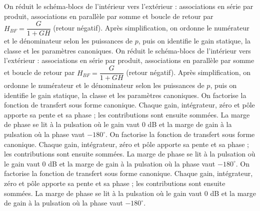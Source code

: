 \begin{corrigebox}[Corrigé]
On réduit le schéma-blocs de l'intérieur vers l'extérieur : associations en série par produit, associations en parallèle par somme et boucle de retour par $H_{BF}=\dfrac{G}{1+GH}$ (retour négatif). Après simplification, on ordonne le numérateur et le dénominateur selon les puissances de $p$, puis on identifie le gain statique, la classe et les paramètres canoniques.
On réduit le schéma-blocs de l'intérieur vers l'extérieur : associations en série par produit, associations en parallèle par somme et boucle de retour par $H_{BF}=\dfrac{G}{1+GH}$ (retour négatif). Après simplification, on ordonne le numérateur et le dénominateur selon les puissances de $p$, puis on identifie le gain statique, la classe et les paramètres canoniques.
On factorise la fonction de transfert sous forme canonique. Chaque gain, intégrateur, zéro et pôle apporte sa pente et sa phase ; les contributions sont ensuite sommées. La marge de phase se lit à la pulsation où le gain vaut $0$ dB et la marge de gain à la pulsation où la phase vaut $-180^\circ$.
On factorise la fonction de transfert sous forme canonique. Chaque gain, intégrateur, zéro et pôle apporte sa pente et sa phase ; les contributions sont ensuite sommées. La marge de phase se lit à la pulsation où le gain vaut $0$ dB et la marge de gain à la pulsation où la phase vaut $-180^\circ$.
On factorise la fonction de transfert sous forme canonique. Chaque gain, intégrateur, zéro et pôle apporte sa pente et sa phase ; les contributions sont ensuite sommées. La marge de phase se lit à la pulsation où le gain vaut $0$ dB et la marge de gain à la pulsation où la phase vaut $-180^\circ$.
\end{corrigebox}
